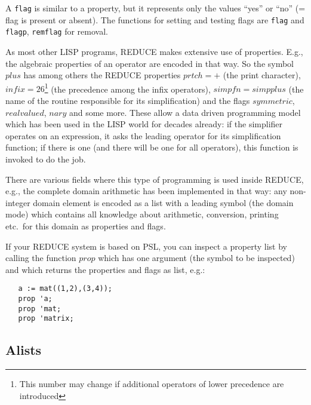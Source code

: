 \documentclass[11pt]{article}
\makeatletter
\newcommand{\reduce}{\small REDUCE}
\newcommand{\ttindex}[1]{\index{#1@{\texttt{#1}}}}
\makeatother
\begin{document}
A \texttt{flag} is similar to a property, but
it represents only the values ``yes'' or ``no'' (= flag is
present or absent). The functions for setting and
testing flags are \texttt{flag}\ttindex{flag} and \texttt{flagp},
\texttt{remflag} for removal.

As most other LISP programs, {\reduce} makes extensive use of properties.
E.g., the  algebraic properties of an operator are encoded
in that way. So the symbol $plus$ has among others the {\reduce}
properties $prtch=+$ (the print character),
$infix=26$\footnote{This number may change if additional operators
of lower precedence are introduced}
(the precedence among the infix operators), $simpfn=simpplus$
(the name of the routine responsible for its simplification)
and the flags $symmetric$, $realvalued$, $nary$ and some more.
These allow a data driven programming model which has been used
in the LISP world for decades already: if the simplifier
operates on an expression, it asks the leading operator for
its simplification function; if there is one (and there will be
one for all operators), this function is invoked to do the job.

There are various fields where this type of programming is used
inside {\reduce}, e.g., the complete domain arithmetic has been
implemented in that way: any non-integer domain element is encoded
as a list with a leading symbol (the domain mode) which contains
all knowledge about arithmetic, conversion, printing etc.\  for
this domain as properties and flags.

If your {\reduce} system is based on PSL, you can inspect a
property list by calling the function $prop$\ttindex{prop} which
has one argument (the symbol to be inspected) and which returns
the properties and flags as list, e.g.:
\begin{verbatim}
   a := mat((1,2),(3,4));
   prop 'a;
   prop 'mat;
   prop 'matrix;
\end{verbatim}


\subsection{Alists}
\end{document}
